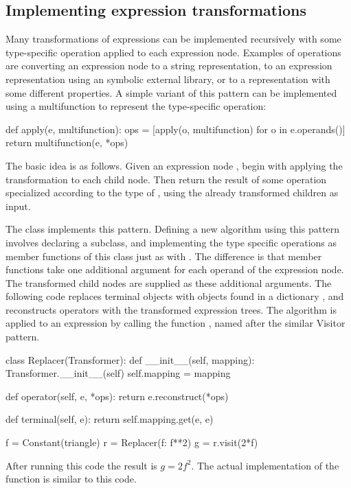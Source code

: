 \vspace*{-1.5pt}
\subsection{Implementing expression transformations}
\label{ufl:sec:transformer}

Many transformations of expressions can be implemented recursively with
some type-specific operation applied to each expression node.  Examples of
operations are converting an expression node to a string representation,
to an expression representation using an symbolic external library, or
to a \ufl{} representation with some different properties.  A simple
variant of this pattern can be implemented using a multifunction to
represent the type-specific operation:\vspace*{-2pt}
\begin{python}
def apply(e, multifunction):
    ops = [apply(o, multifunction) for o in e.operands()]
    return multifunction(e, *ops)
\end{python}
The basic idea is as follows. Given an expression node , begin
with applying the transformation to each child node.  Then return the
result of some operation specialized according to the type of ,
using the already transformed children as input.

The  class implements this pattern.  Defining a new
algorithm using this pattern involves declaring a 
subclass, and implementing the type specific operations as member
functions of this class just as with .  The difference
is that member functions take one additional argument for each operand
of the expression node. The transformed child nodes are supplied as these
additional arguments.  The following code replaces terminal objects with
objects found in a dictionary , and reconstructs operators
with the transformed expression trees. The algorithm is applied to an
expression by calling the function , named after the similar
Visitor pattern.\vspace*{-2pt}
\begin{python}
class Replacer(Transformer):
    def __init__(self, mapping):
        Transformer.__init__(self)
        self.mapping = mapping

    def operator(self, e, *ops):
        return e.reconstruct(*ops)

    def terminal(self, e):
        return self.mapping.get(e, e)

f = Constant(triangle)
r = Replacer({f: f**2})
g = r.visit(2*f)
\end{python}
After running this code the result is $g = 2 f^2$.  The actual
implementation of the  function is similar to this code.

